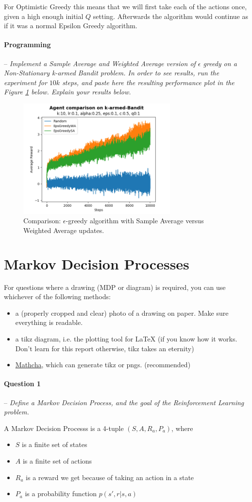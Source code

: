 \documentclass[a4paper]{article}
\newcommand{\question}[2]{
\paragraph{Question #1} -- \textit{#2}

}
\newcommand{\programming}[1]{
\paragraph{Programming} -- \textit{#1}

}
\begin{document}
For Optimistic Greedy this means that we will first take each of the actions once, given a high enough initial $Q$ setting. Afterwards the algorithm would continue as if it was a normal Epsilon Greedy algorithm.

\programming{Implement a Sample Average and Weighted Average version of $\epsilon$ greedy on a Non-Stationary k-armed Bandit problem. In order to see results, run the experiment for $10k$ steps, and paste here the resulting performance plot in the Figure \ref{fig:sa_vs_wa} below. Explain your results below.}
\begin{figure}[H]
    \centering
    \includegraphics[width=8cm]{plots/e_Greedy.png}
    \caption{Comparison: $\epsilon$-greedy algorithm with Sample Average versus Weighted Average updates.}
    \label{fig:sa_vs_wa}
\end{figure}{}


\section{Markov Decision Processes}
For questions where a drawing (MDP or diagram) is required, you can use whichever of the following methods:
\begin{itemize}
    \item a (properly cropped and clear) photo of a drawing on paper. Make sure everything is readable.
    \item a tikz diagram, i.e. the plotting tool for LaTeX (if you know how it works. Don't learn for this report otherwise, tikz takes an eternity)
    \item \href{www.mathcha.io}{Mathcha}, which can generate tikz or pngs. (recommended)
\end{itemize}{}

\question{1}{Define a Markov Decision Process, and the goal of the Reinforcement Learning problem.}
A Markov Decision Processs is a 4-tuple $(S, A, R_a, P_a)$, where
\begin{itemize}
    \item $S$ is a finite set of states
    \item $A$ is a finite set of actions
    \item $R_a$ is a reward we get because of taking an action in a state
    \item $P_a$ is a probability function $p(s', r | s, a)$
\end{itemize}
\end{document}
